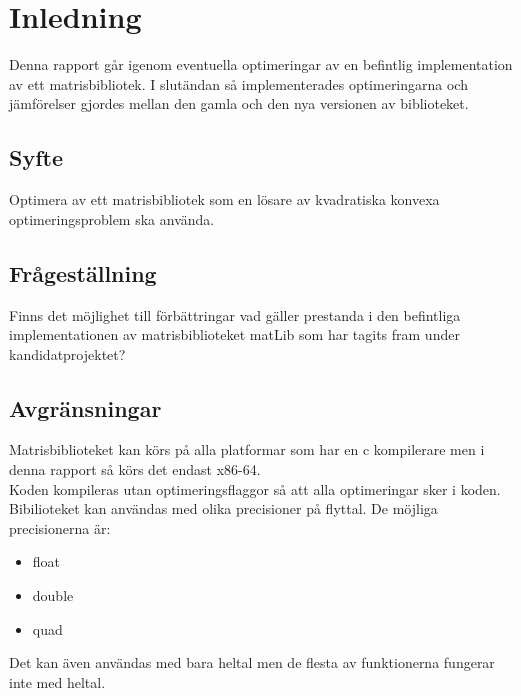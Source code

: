 \section{Inledning}
	Denna rapport går igenom eventuella optimeringar av en befintlig implementation av ett matrisbibliotek. I slutändan så implementerades optimeringarna och jämförelser gjordes mellan den gamla och den nya versionen av biblioteket. 
	\subsection{Syfte}
	Optimera  av ett matrisbibliotek som en lösare av kvadratiska konvexa optimeringsproblem ska använda. 
	\subsection{Frågeställning}
	Finns det möjlighet till förbättringar vad gäller prestanda i den befintliga implementationen av matrisbiblioteket matLib som har tagits fram under kandidatprojektet?
	\subsection{Avgränsningar}
	Matrisbiblioteket kan körs på alla platformar som har en c kompilerare men i denna rapport så körs det endast x86-64. 
	\\
	Koden kompileras utan optimeringsflaggor så att alla optimeringar sker i koden. 
	\\
	Bibilioteket kan användas med olika precisioner på flyttal. De möjliga precisionerna är:
	\begin{itemize}
	\item float
	\item double
	\item quad
	\end{itemize}
	Det kan även användas med bara heltal men de flesta av funktionerna fungerar inte med heltal. 